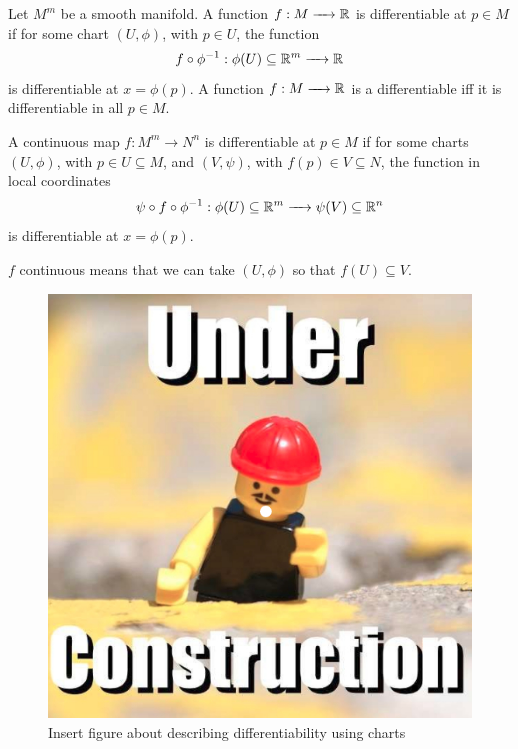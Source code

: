 \begin{definition}
	Let $M^m$ be a smooth manifold.
	A function $f:M\to\bbR$ is differentiable at $p\in M$ if for some chart $(U,\phi)$, with $p\in U$, the function
	$$ f \circ\phi^{-1} : \phi(U) \subseteq \bbR^m \to \bbR$$
	is differentiable at $x=\phi(p)$.
	A function $f:M\to\bbR$ is a differentiable iff it is differentiable in all $p\in M$.
\end{definition}

\begin{definition}
	A continuous map $f:M^m\to N^n$ is differentiable at $p\in M$ if for some charts $(U,\phi)$, with $p\in U\subseteq M$, and $(V,\psi)$, with $f(p)\in V\subseteq N$, the function in local coordinates
	$$ \psi\circ f \circ\phi^{-1} : \phi(U) \subseteq \bbR^m \to \psi(V) \subseteq \bbR^n$$
	is differentiable at $x=\phi(p)$.

	\begin{notabene}
		$f$ continuous means that we can take $(U,\phi)$ so that $f(U)\subseteq V$.
	\end{notabene}
\end{definition}

\begin{figure}[H]
	\centering
	\includegraphics[scale=0.20]{Figures/underconstruction.jpg}
	\caption{\color{red} Insert figure about describing differentiability using charts}
\end{figure}

